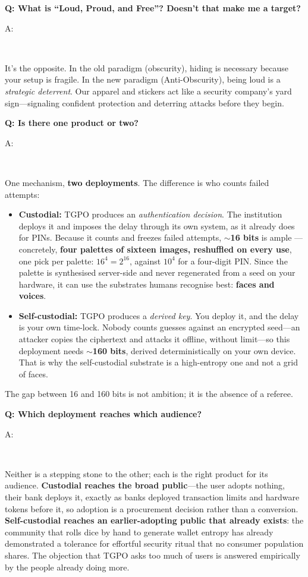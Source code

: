 \documentclass[12pt,a4paper]{article}
\newenvironment{question}[1]{%
  \vspace{0.8em}\noindent\textbf{Q: #1}\par
  \vspace{0.2em}\noindent\begin{itshape}A:\end{itshape}~%
}{\vspace{0.8em}}
\begin{document}
\begin{question}{What is ``Loud, Proud, and Free''? Doesn't that make me a target?}
It's the opposite. In the old paradigm (obscurity), hiding is necessary because your setup is fragile. In the new paradigm (Anti-Obscurity), being loud is a \emph{strategic deterrent}. Our apparel and stickers act like a security company's yard sign—signaling confident protection and deterring attacks before they begin.
\end{question}

\begin{question}{Is there one product or two?}
One mechanism, \textbf{two deployments}. The difference is who counts failed attempts:
\begin{itemize}
  \item \textbf{Custodial:} TGPO produces an \emph{authentication decision}. The institution deploys it and imposes the delay through its own system, as it already does for PINs. Because it counts and freezes failed attempts, $\sim$\textbf{16 bits} is ample --- concretely, \textbf{four palettes of sixteen images, reshuffled on every use}, one pick per palette: $16^4 = 2^{16}$, against $10^4$ for a four-digit PIN. Since the palette is synthesised server-side and never regenerated from a seed on your hardware, it can use the substrates humans recognise best: \textbf{faces and voices}.
  \item \textbf{Self-custodial:} TGPO produces a \emph{derived key}. You deploy it, and the delay is your own time-lock. Nobody counts guesses against an encrypted seed---an attacker copies the ciphertext and attacks it offline, without limit---so this deployment needs $\sim$\textbf{160 bits}, derived deterministically on your own device. That is why the self-custodial substrate is a high-entropy one and not a grid of faces.
\end{itemize}
The gap between 16 and 160 bits is not ambition; it is the absence of a referee.
\end{question}

\begin{question}{Which deployment reaches which audience?}
Neither is a stepping stone to the other; each is the right product for its audience. \textbf{Custodial reaches the broad public}---the user adopts nothing, their bank deploys it, exactly as banks deployed transaction limits and hardware tokens before it, so adoption is a procurement decision rather than a conversion. \textbf{Self-custodial reaches an earlier-adopting public that already exists}: the community that rolls dice by hand to generate wallet entropy has already demonstrated a tolerance for effortful security ritual that no consumer population shares. The objection that TGPO asks too much of users is answered empirically by the people already doing more.
\end{question}
\end{document}
